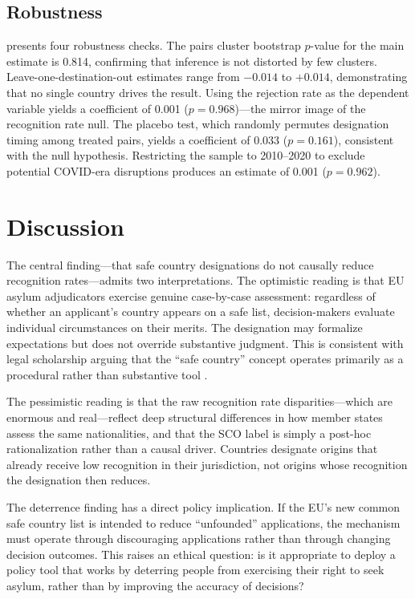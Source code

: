 \documentclass[12pt]{article}
\begin{document}


\subsection{Robustness}

 presents four robustness checks. The pairs cluster bootstrap $p$-value for the main estimate is 0.814, confirming that inference is not distorted by few clusters. Leave-one-destination-out estimates range from $-0.014$ to $+0.014$, demonstrating that no single country drives the result. Using the rejection rate as the dependent variable yields a coefficient of 0.001 ($p = 0.968$)---the mirror image of the recognition rate null. The placebo test, which randomly permutes designation timing among treated pairs, yields a coefficient of 0.033 ($p = 0.161$), consistent with the null hypothesis. Restricting the sample to 2010--2020 to exclude potential COVID-era disruptions produces an estimate of 0.001 ($p = 0.962$).



\section{Discussion}

The central finding---that safe country designations do not causally reduce recognition rates---admits two interpretations. The optimistic reading is that EU asylum adjudicators exercise genuine case-by-case assessment: regardless of whether an applicant's country appears on a safe list, decision-makers evaluate individual circumstances on their merits. The designation may formalize expectations but does not override substantive judgment. This is consistent with legal scholarship arguing that the ``safe country'' concept operates primarily as a procedural rather than substantive tool \citep{costello2016safe, goodwin2007safe}.

The pessimistic reading is that the raw recognition rate disparities---which are enormous and real---reflect deep structural differences in how member states assess the same nationalities, and that the SCO label is simply a post-hoc rationalization rather than a causal driver. Countries designate origins that already receive low recognition in their jurisdiction, not origins whose recognition the designation then reduces.

The deterrence finding has a direct policy implication. If the EU's new common safe country list is intended to reduce ``unfounded'' applications, the mechanism must operate through discouraging applications rather than through changing decision outcomes. This raises an ethical question: is it appropriate to deploy a policy tool that works by deterring people from exercising their right to seek asylum, rather than by improving the accuracy of decisions?
\end{document}
